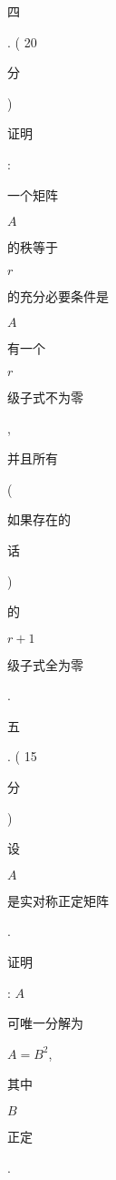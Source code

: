 \documentclass[10pt]{article}
\begin{document}
\begin{CJK}{UTF8}{mj}四\end{CJK}. ( 20 \begin{CJK}{UTF8}{mj}分\end{CJK}) \begin{CJK}{UTF8}{mj}证明\end{CJK}: \begin{CJK}{UTF8}{mj}一个矩阵\end{CJK} $A$ \begin{CJK}{UTF8}{mj}的秩等于\end{CJK} $r$ \begin{CJK}{UTF8}{mj}的充分必要条件是\end{CJK} $A$ \begin{CJK}{UTF8}{mj}有一个\end{CJK} $r$ \begin{CJK}{UTF8}{mj}级子式不为零\end{CJK}, \begin{CJK}{UTF8}{mj}并且所有\end{CJK}(\begin{CJK}{UTF8}{mj}如果存在的\end{CJK} \begin{CJK}{UTF8}{mj}话\end{CJK})\begin{CJK}{UTF8}{mj}的\end{CJK} $r+1$ \begin{CJK}{UTF8}{mj}级子式全为零\end{CJK}.

\begin{CJK}{UTF8}{mj}五\end{CJK}. ( 15 \begin{CJK}{UTF8}{mj}分\end{CJK}) \begin{CJK}{UTF8}{mj}设\end{CJK} $A$ \begin{CJK}{UTF8}{mj}是实对称正定矩阵\end{CJK}. \begin{CJK}{UTF8}{mj}证明\end{CJK}: $A$ \begin{CJK}{UTF8}{mj}可唯一分解为\end{CJK} $A=B^{2}$, \begin{CJK}{UTF8}{mj}其中\end{CJK} $B$ \begin{CJK}{UTF8}{mj}正定\end{CJK}.
\end{document}
